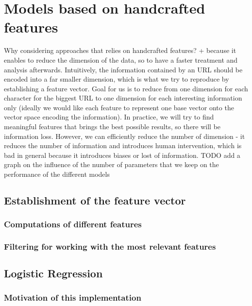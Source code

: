 \documentclass{article}
\begin{document}
    \section{Models based on handcrafted features}\label{sec:models-based-on-handcrafted-features}

    Why considering approaches that relies on handcrafted features?
    + because it enables to reduce the dimension of the data, so to have a faster treatment and analysis afterwards.
    Intuitively, the information contained by an URL should be encoded into a far smaller dimension, which is what we try to reproduce by establishing a feature vector.
    Goal for us is to reduce from one dimension for each character for the biggest URL to one dimension for each interesting information only (ideally we would like each feature to represent one base vector onto the vector space encoding the information).
    In practice, we will try to find meaningful features that brings the best possible results, so there will be information loss.
    However, we can efficiently reduce the number of dimension
    - it reduces the number of information and introduces human intervention, which is bad in general because it introduces biases or lost of information.
    TODO add a graph on the influence of the number of parameters that we keep on the performance of the different models

    \subsection{Establishment of the feature vector}\label{subsec:establishement-of-the-feature-vector}

    \subsubsection{Computations of different features}

    \subsubsection{Filtering for working with the most relevant features}

    \subsection{Logistic Regression}\label{subsec:logistic-regression}

    \subsubsection{Motivation of this implementation}
\end{document}
